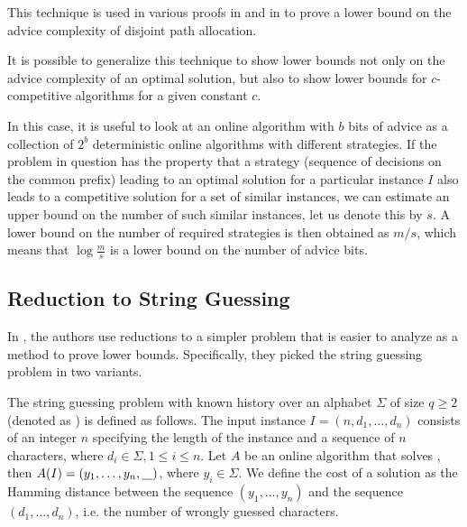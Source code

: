 This technique is used in various proofs in \cite{misof-trivial-graphs}
and in \cite{komm-thesis} to prove a lower bound on the advice complexity
of disjoint path allocation.

It is possible to generalize this technique to show lower bounds not only
on the advice complexity of an optimal solution, but also to show lower
bounds for $c$-competitive algorithms for a given constant $c$.

In this case, it is useful to look at an online algorithm with $b$ bits of
advice as a collection of $2^b$ deterministic online algorithms with
different strategies. If the problem in question has the property that a
strategy (sequence of decisions on the common prefix) leading to an
optimal solution for a particular instance $I$ also leads to a competitive
solution for a set of similar instances, we can estimate an upper bound on
the number of such similar instances, let us denote this by $s$. A lower
bound on the number of required strategies is then obtained as $m/s$,
which means that $\log\frac{m}{s}$ is a lower bound on the number of
advice bits.

\subsection{Reduction to String Guessing}
\label{section:string-guessing}

In \cite{string-guessing}, the authors use reductions to a simpler problem
that is easier to analyze as a method to prove lower bounds. Specifically,
they picked the string guessing problem in two variants.

\begin{definition}
    The string guessing problem with known history over an alphabet
    $\Sigma$ of size $q \geq 2$ (denoted as ) is defined as
    follows. The input instance $I = (n, d_1, \dots, d_n)$ consists of an
    integer $n$ specifying the length of the instance and a sequence of
    $n$ characters, where $d_i \in \Sigma, 1 \leq i \leq n$. Let $A$ be an
    online algorithm that solves , then $A(I) = (y_1, \dots, y_n,
    \underline{\hspace*{0.3cm}})$, where $y_i \in \Sigma$. We define the cost of a
    solution as the Hamming distance between the sequence $(y_1, \dots,
    y_n)$ and the sequence $(d_1, \dots, d_n)$, i.e. the number of
    wrongly guessed characters.
\end{definition}

